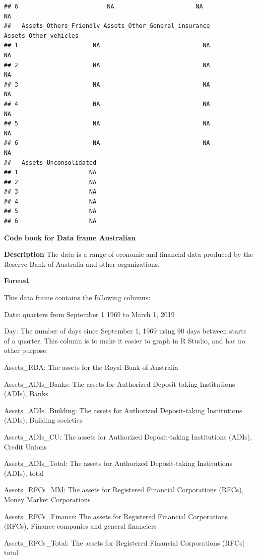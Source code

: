 \documentclass[
]{book}
\begin{document}
\begin{verbatim}
## 6                         NA                       NA                        NA
##   Assets_Others_Friendly Assets_Other_General_insurance Assets_Other_vehicles
## 1                     NA                             NA                    NA
## 2                     NA                             NA                    NA
## 3                     NA                             NA                    NA
## 4                     NA                             NA                    NA
## 5                     NA                             NA                    NA
## 6                     NA                             NA                    NA
##   Assets_Unconsolidated
## 1                    NA
## 2                    NA
## 3                    NA
## 4                    NA
## 5                    NA
## 6                    NA
\end{verbatim}

\textbf{Code book for Data frame Australian}

\textbf{Description}
The data is a range of economic and financial data produced by the Reserve Bank of Australia and other organizations.

\textbf{Format}

This data frame contains the following columns:

Date: quarters from September 1 1969 to March 1, 2019

Day: The number of days since September 1, 1969 using 90 days between starts of a quarter. This column is to make it easier to graph in R Studio, and has no other purpose.

Assets\_RBA: The assets for the Royal Bank of Australia

Assets\_ADIs\_Banks: The assets for Authorized Deposit-taking Institutions (ADIs), Banks

Assets\_ADIs\_Building: The assets for Authorized Deposit-taking Institutions (ADIs), Building societies

Assets\_ADIs\_CU: The assets for Authorized Deposit-taking Institutions (ADIs), Credit Unions

Assets\_ADIs\_Total: The assets for Authorized Deposit-taking Institutions (ADIs), total

Assets\_RFCs\_MM: The assets for Registered Financial Corporations (RFCs), Money Market Corporations

Assets\_RFCs\_Finance: The assets for Registered Financial Corporations (RFCs), Finance companies and general financiers

Assets\_RFCs\_Total: The assets for Registered Financial Corporations (RFCs) total
\end{document}
